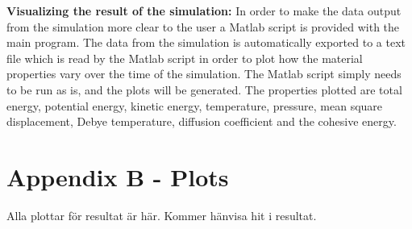 \documentclass[12pt,a4paper]{article}
\begin{document}
\textbf{Visualizing the result of the simulation:} 
In order to make the data output from the simulation more clear to the user a Matlab script is provided with the main program. The data from the simulation is automatically exported to a text file which is read by the Matlab script in order to plot how the material properties vary over the time of the simulation. The Matlab script simply needs to be run as is, and the plots will be generated. The properties plotted are total energy, potential energy, kinetic energy, temperature, pressure, mean square displacement, Debye temperature, diffusion coefficient and the cohesive energy.

\newpage
\section{Appendix B - Plots}
\label{sec:AppendixB}
Alla plottar för resultat är här. Kommer hänvisa hit i resultat.
\end{document}
